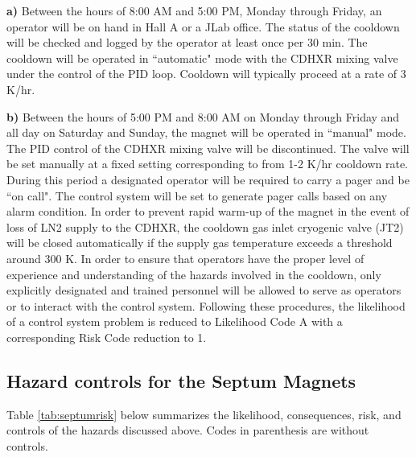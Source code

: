 \begin{list}{--}{\setlength{\itemsep}{0.cm}}
\item {\bf a)} Between the hours of 8:00 AM and 5:00 PM, Monday through Friday, an operator will be on hand 
in Hall A or a JLab office.  The status of the cooldown will be checked and logged by the operator at least 
once per 30 min.  The cooldown will be operated in ``automatic" mode with the CDHXR mixing valve under the 
control of the PID loop.  Cooldown will typically proceed at a rate of 3 K/hr.

\item{\bf b)} Between the hours of 5:00 PM and 8:00 AM on Monday through Friday and all day on Saturday and 
Sunday, the magnet will be operated in ``manual" mode.  The PID control of the CDHXR mixing valve will be 
discontinued.  The valve will be set manually at a fixed setting corresponding to from 1-2  K/hr cooldown 
rate.  During this period a designated operator will be required to carry a pager and be ``on call".  The 
control system will be set to generate pager calls based on any alarm condition.
In order to prevent rapid warm-up of the magnet in the event of loss of LN2 supply to the CDHXR, the cooldown 
gas inlet cryogenic valve (JT2) will be closed automatically if the supply gas temperature exceeds a 
threshold around 300 K.  In order to ensure that operators have the proper level of experience and 
understanding of the hazards involved in the cooldown, only explicitly designated and trained personnel 
 will be allowed to serve as operators or to interact with the control system.  Following 
these procedures, the likelihood of a control system problem is reduced to Likelihood Code A with a 
corresponding Risk Code reduction to 1.
\end{list}

\begin{safetyen}{10}{15}
\subsection {\bf Hazard controls for the Septum Magnets}
\end{safetyen}

Table \ref{tab:septumrisk} below summarizes the likelihood, consequences, risk, and controls of the hazards discussed
above. 
Codes in parenthesis are without controls.

